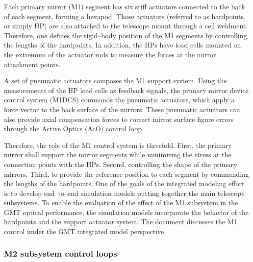 \documentclass{gmto}
\begin{document}
Each primary mirror (M1) segment has six stiff actuators connected to the back of each segment, forming a hexapod. Those actuators (referred to as hardpoints, or simply HP) are also attached to the telescope mount through a cell weldment. Therefore, one defines the rigid--body position of the M1 segments by controlling the lengths of the hardpoints. In addition, the HPs have load cells mounted on the extremum of the actuator rods to measure the forces at the mirror attachment points.


A set of pneumatic actuators composes the M1 support system. Using the measurements of the HP load cells as feedback signals, the primary mirror device control system (M1DCS) commands the pneumatic actuators, which apply a force vector to the back surface of the mirrors. These pneumatic actuators can also provide axial compensation forces to correct mirror surface figure errors through the Active Optics (AcO) control loop.


Therefore, the role of the M1 control system is threefold. First, the primary mirror shall support the mirror segments while minimizing the stress at the connection points with the HPs. Second, controlling the shape of the primary mirrors. Third, to provide the reference position to each segment by commanding the lengths of the hardpoints. One of the goals of the integrated modeling effort is to develop end--to--end simulation models putting together the main telescope subsystems. To enable the evaluation of the effect of the M1 subsystem in the GMT optical performance, the simulation models incorporate the behavior of the hardpoints and the support actuator system. The document \cite{GMT.DOC.05153} discusses the M1 control under the GMT integrated model perspective.



\subsubsection{M2 subsystem control loops}
\label{sec:m2-ctrl}
\end{document}
